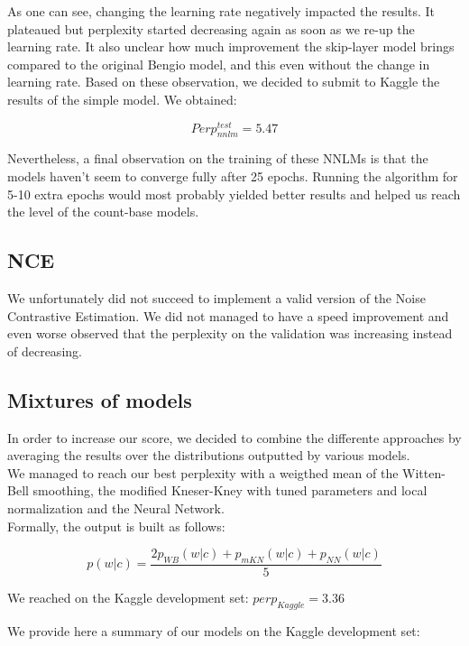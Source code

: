 \documentclass[11pt]{article}
\begin{document}
\noindent As one can see, changing the learning rate negatively impacted the results. It plateaued but perplexity started decreasing again as soon as we re-up the learning rate. It also unclear how much improvement the skip-layer model brings compared to the original Bengio model, and this even without the change in learning rate. Based on these observation, we decided to submit to Kaggle the results of the simple model. We obtained:

$$Perp^{test}_{nnlm} = 5.47$$

\noindent Nevertheless, a final observation on the training of these NNLMs is that the models haven't seem to converge fully after 25 epochs. Running the algorithm for 5-10 extra epochs would most probably yielded better results and helped us reach the level of the count-base models.

\subsection{NCE}

We unfortunately did not succeed to implement a valid version of the Noise Contrastive Estimation. We did not managed to have a speed improvement and even worse observed that the perplexity on the validation was increasing instead of decreasing.

\subsection{Mixtures of models}
In order to increase our score, we decided to combine the differente approaches by averaging the results over the distributions outputted by various models.\\

\noindent We managed to reach our best perplexity with a weigthed mean of the Witten-Bell smoothing, the modified Kneser-Kney with tuned parameters and local normalization and the Neural Network.\\

\noindent Formally, the output is built as follows:

\[
p(w|c) = \frac{2p_{WB}(w|c) + p_{mKN}(w|c) + p_{NN}(w|c)}{5}
\]

We reached on the Kaggle development set: $ perp_{Kaggle} = 3.36$

We provide here a summary of our models on the Kaggle development set:
\end{document}
